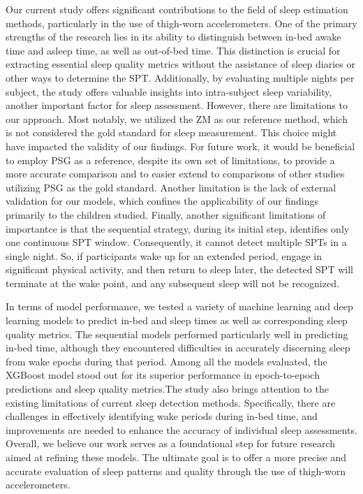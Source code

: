 \documentclass[
  10pt,
]{scrbook}
\begin{document}
Our current study offers significant contributions to the field of sleep
estimation methods, particularly in the use of thigh-worn
accelerometers. One of the primary strengths of the research lies in its
ability to distinguish between in-bed awake time and asleep time, as
well as out-of-bed time. This distinction is crucial for extracting
essential sleep quality metrics without the assistance of sleep diaries
or other ways to determine the SPT. Additionally, by evaluating multiple
nights per subject, the study offers valuable insights into
intra-subject sleep variability, another important factor for sleep
assessment. However, there are limitations to our approach. Most
notably, we utilized the ZM as our reference method, which is not
considered the gold standard for sleep measurement. This choice might
have impacted the validity of our findings. For future work, it would be
beneficial to employ PSG as a reference, despite its own set of
limitations, to provide a more accurate comparison and to easier extend
to comparisons of other studies utilizing PSG as the gold standard.
Another limitation is the lack of external validation for our models,
which confines the applicability of our findings primarily to the
children studied. Finally, another significant limitations of
importantce is that the sequential strategy, during its initial step,
identifies only one continuous SPT window. Consequently, it cannot
detect multiple SPTs in a single night. So, if participants wake up for
an extended period, engage in significant physical activity, and then
return to sleep later, the detected SPT will terminate at the wake
point, and any subsequent sleep will not be recognized.

In terms of model performance, we tested a variety of machine learning
and deep learning models to predict in-bed and sleep times as well as
corresponding sleep quality metrics. The sequential models performed
particularly well in predicting in-bed time, although they encountered
difficulties in accurately discerning sleep from wake epochs during that
period. Among all the models evaluated, the XGBoost model stood out for
its superior performance in epoch-to-epoch predictions and sleep quality
metrics.The study also brings attention to the existing limitations of
current sleep detection methods. Specifically, there are challenges in
effectively identifying wake periods during in-bed time, and
improvements are needed to enhance the accuracy of individual sleep
assessments. Overall, we believe our work serves as a foundational step
for future research aimed at refining these models. The ultimate goal is
to offer a more precise and accurate evaluation of sleep patterns and
quality through the use of thigh-worn accelerometers.
\end{document}
